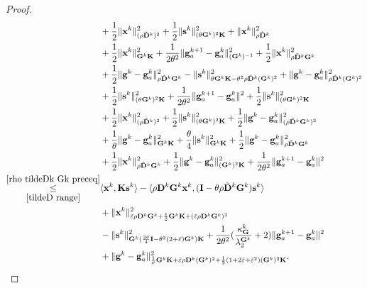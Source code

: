 \documentclass[12pt,draftcls,onecolumn]{IEEEtran}
\newcommand{\bx}{{\mathbf{x}}}
\newcommand{\bG}{{\mathbf{G}}}
\newcommand{\bK}{{\mathbf{K}}}
\newcommand{\bg}{{\mathbf{g}}}
\newcommand{\bs}{{\mathbf{s}}}
\newcommand{\bD}{{\mathbf{D}}}
\begin{document}
\begin{proof}
\begin{align}
	&+\frac{1}{2}\|\mathbf{x}^k\|^2_{(\rho \tilde{\mathbf{D}}^k)^2}+\frac{1}{2}\|\mathbf{s}^k\|^2_{(\theta\bG^k)^2\bK}+ \|\mathbf{x}^k\|^2_{\rho \tilde{\mathbf{D}}^k}\notag\\
	& +\frac{1}{2}\|\mathbf{x}^k\|^2_{\mathbf{G}^k\mathbf{K}}+\frac{1}{2\theta^2}\|\mathbf{g}_a^{k+1}-\mathbf{g}_a^k\|^2_{(\mathbf{G}^k)^{-1}} +\frac{1}{2}\|\mathbf{x}^k\|^2_{\rho\tilde{\mathbf{D}}^k\bG^k}\notag\\
	& +\frac{1}{2}\|\mathbf{g}^k-\mathbf{g}^k_a\|^2_{\rho\tilde{\mathbf{D}}^k\bG^k}-\|\mathbf{s}^k\|^2_{\theta \mathbf{G}^k\mathbf{K}-\theta^2\rho\tilde{\mathbf{D}}^k(\mathbf{G}^k)^2} +\|\mathbf{g}^k-\mathbf{g}_a^k\|^2_{\rho \tilde{\mathbf{D}}^k(\mathbf{G}^k)^2} \notag\\
	&+\frac{1}{2}\|\mathbf{s}^k\|^2_{(\theta \mathbf{G}^k)^2\mathbf{K}} +\frac{1}{2\theta^2}\|\mathbf{g}_a^{k+1}-\mathbf{g}_a^k\|^2 + \frac{1}{2}\|\mathbf{s}^k\|^2_{(\theta\mathbf{G}^k)^2\bK}\notag\\
	& +\frac{1}{2}\|\mathbf{x}^k\|^2_{(\rho \tilde{\mathbf{D}}^k)^2} +\frac{1}{2}\|\mathbf{s}^k\|^2_{(\theta \mathbf{G}^k)^2\mathbf{K}} + \frac{1}{2}\|\mathbf{g}^k-\mathbf{g}_a^k\|^2_{(\rho \tilde{\mathbf{D}}^k\bG^k)^2}\notag\\
	&+\frac{1}{\theta}\|\mathbf{g}^k-\mathbf{g}_a^k\|^2_{\mathbf{G}^k\mathbf{K}}+\frac{\theta}{4}\|\mathbf{s}^k\|^2_{\mathbf{G}^k\mathbf{K}}+\frac{1}{2}\|\mathbf{g}^k-\mathbf{g}_a^k\|^2_{\rho \tilde{\mathbf{D}}^k\mathbf{G}^k} \notag\\
	&  + \frac{1}{2}\|\mathbf{x}^k\|^2_{\rho \tilde{\mathbf{D}}^k\mathbf{G}^k} +\frac{1}{2}\|\mathbf{g}^k-\mathbf{g}_a^k\|^2_{(\mathbf{G}^k)^2\mathbf{K}} +\frac{1}{2\theta^2}\|\mathbf{g}_a^{k+1}-\mathbf{g}_a^k\|^2\notag\\
	\underset{\eqref{tildeD range}}{\overset{\eqref{rho tildeDk Gk preceq}}{\leq}}& \langle \mathbf{x}^k, \mathbf{K}\mathbf{s}^{k} \rangle - \langle \rho\mathbf{D}^k\mathbf{G}^k\mathbf{x}^k,(\mathbf{I}-\theta\rho\tilde{\mathbf{D}}^k\mathbf{G}^k)\mathbf{s}^k \rangle\notag\\
	& + \|\bx^k\|^2_{\bar{\varepsilon}\rho\bD^k\bG^k+\frac{1}{2}\bG^k\bK+(\bar{\varepsilon}\rho\bD^k\bG^k)^2}\notag\\
	&-\|\bs^k\|^2_{\mathbf{G}^k(\frac{3\theta}{4}\mathbf{I}-\theta^2(2+\bar{\varepsilon})\bG^k)\bK}+\frac{1}{2\theta^2}(\frac{\kappa_\bG^k}{\lambda_2^{\bG^k}}+2)\|\bg_a^{k+1}-\bg_a^k\|^2\notag\\
	&+\|\bg^k-\bg_a^k\|^2_{\frac{1}{\theta}\bG^k\bK+\bar{\varepsilon}\rho\bD^k(\bG^k)^2+\frac{1}{2}(1+2\bar{\varepsilon}+\bar{\varepsilon}^2)(\bG^k)^2\bK}.
	\label{xk+1, sk+1 original}
\end{align}


\end{proof}
\end{document}
